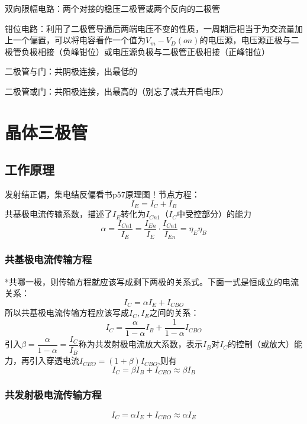 \documentclass{ctexart}
\begin{document}
双向限幅电路：两个对接的稳压二极管或两个反向的二极管

钳位电路：利用了二极管导通后两端电压不变的性质，一周期后相当于为交流量加上一个偏置，可以将电容看作一个值为$V_m-V_D(on)$的电压源，电压源正极与二极管负极相接（负峰钳位）或电压源负极与二极管正极相接（正峰钳位）

二极管与门：共阴极连接，出最低的

二极管或门：共阳极连接，出最高的（别忘了减去开启电压）
\section{晶体三极管}
\subsection{工作原理}
发射结正偏，集电结反偏{\color{Red}看书p57原理图！}节点方程：
\begin{equation}
    I_E=I_C+I_B
\end{equation}
共基极电流传输系数，描述了$I_E$转化为$I_{Cn1}$（$I_C$中受控部分）的能力
\begin{equation}
    \alpha=\dfrac{I_{Cn1}}{I_E}=\dfrac{I_{En}}{I_E}\cdot \dfrac{I_{Cn1}}{I_{En}}=\eta_E\eta_B 
\end{equation}

\subsubsection{共基极电流传输方程}
*共哪一极，则传输方程就应该写成剩下两极的关系式。下面一式是恒成立的电流关系：
\begin{equation}
    I_C=\alpha I_E+I_{CBO}
\end{equation}
所以共基极电流传输方程应该写成$I_C,I_E$之间的关系：
\begin{equation}
    I_C=\dfrac{\alpha}{1-\alpha}I_B+\dfrac{1}{1-\alpha}I_{CBO}
\end{equation}
引入$\beta = \dfrac{\alpha}{1-\alpha}=\dfrac{I_C}{I_B}$称为共发射极电流放大系数，表示$I_B$对$I_C$的控制（或放大）能力，再引入穿透电流$I_{CEO}=(1+\beta)I_{CBO}$,则有
\begin{equation}
    I_C=\beta I_B+I_{CEO}\approx\beta I_B
\end{equation}
\subsubsection{共发射极电流传输方程}
\begin{equation}
    I_C=\alpha I_E+I_{CBO}\approx \alpha I_E
\end{equation}
\end{document}
